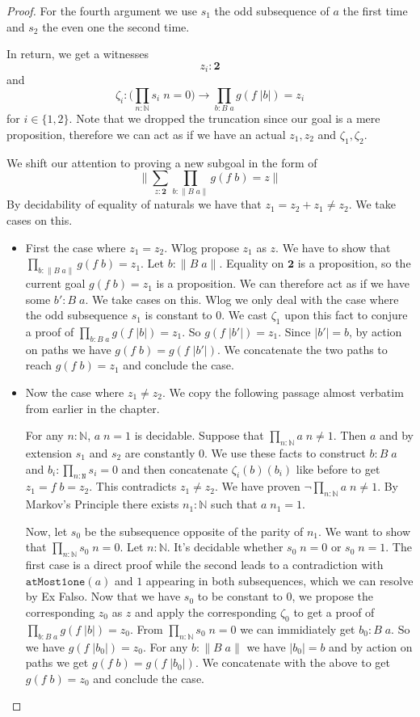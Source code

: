 \documentclass[12pt]{report}
\begin{document}
\begin{proof}
For the fourth argument we use $s_1$ the odd subsequence of $a$ the first time and $s_2$ the even one the second time. 

In return, we get a witnesses 
$$z_i : \mathbf{2}$$
and
$$\zeta_i : \Big(\prod_{n : \mathbb{N}}s_i\; n = 0 \Big)\rightarrow \prod_{b : B\; a} g(f\; |b|) = z_i$$
for $i \in \{1,2\}$.  
Note that we dropped the truncation since our goal is a mere proposition, therefore we can act as if we have an actual $z_1,z_2$ and $\zeta_1, \zeta_2$. 

We shift our attention to proving a new subgoal in the form of 
$$\Big\lVert \sum_{z : \mathbf{2}} \prod_{b : \lVert B\; a\rVert} g(f\; b) = z \Big\rVert$$
By decidability of equality of naturals we have that $z_1 = z_2 + z_1 \neq z_2$. 
We take cases on this. 
\begin{itemize}
\item First the case where $z_1 = z_2$. 
Wlog propose $z_1$ as $z$. 
We have to show that $\prod_{b : \lVert B\;a\rVert}g(f\;b)=z_1$. 
Let $b : \lVert B\;a \rVert$. 
Equality on $\mathbf{2}$ is a proposition, so the current goal $g(f\;b)=z_1$ is a proposition. 
We can therefore act as if we have some $b' : B\;a$. 
We take cases on this. 
Wlog we only deal with the case where the odd subsequence $s_1$ is constant to $0$. 
We cast $\zeta_1$ upon this fact to conjure a proof of $\prod_{b : B\; a} g(f\; |b|) = z_1$. 
So $g(f\;|b'|) = z_1$. 
Since $|b'| = b$, by action on paths we have $g(f\;b) = g(f\;|b'|)$. 
We concatenate the two paths to reach $g(f\;b) = z_1$ and conclude the case. 

\item Now the case where $z_1 \neq z_2$. 
We copy the following passage almost verbatim from earlier in the chapter. 

For any $n : \mathbb{N}$, $a\; n = 1$ is decidable. 
Suppose that $\prod_{n : 
\mathbb{N}} a\; n \neq 1$. 
Then $a$ and by extension $s_1$ and $s_2$ are constantly $0$. 
We use these facts to construct $b : B\;a$ and $b_i : \prod_{n : \mathtt{N}}s_i = 0$ and then concatenate $\zeta_i(b)(b_i)$ like before to get $z_1 = f\; b = z_2$. 
This contradicts $z_1 \neq z_2$. 
We have proven $\neg \prod_{n : 
\mathbb{N}} a\; n \neq 1$. 
By Markov's Principle there exists $n_1 : \mathbb{N}$ such that $a\; n_1 = 1$. 

Now, let $s_0$ be the subsequence opposite of the parity of $n_1$. 
We want to show that $\prod_{n : \mathbb{N}}s_0\; n = 0$. 
Let $n : \mathbb{N}$. 
It's decidable whether $s_0\;n = 0$ or $s_0\;n=1$. 
The first case is a direct proof while the second leads to a contradiction with $\mathtt{atMost1one}(a)$ and $1$ appearing in both subsequences, which we can resolve by Ex Falso. 
Now that we have $s_0$ to be constant to $0$, we propose the corresponding $z_0$ as $z$ and apply the corresponding $\zeta_0$ to get a proof of $\prod_{b : B\;a}g(f\;|b|) = z_0$. 
From $\prod_{n:\mathbb{N}}s_0\; n = 0$ we can immidiately get $b_0  : B\;a$. 
So we have $g(f\;|b_0|) = z_0$. 
For any $b : \lVert B\;a \rVert$ we have $|b_0| = b$ and by action on paths we get $g(f\;b) = g(f\;|b_0|)$. 
We concatenate with the above to get $g(f\;b) = z_0$ and conclude the case.


\end{itemize}
\end{proof}
\end{document}
